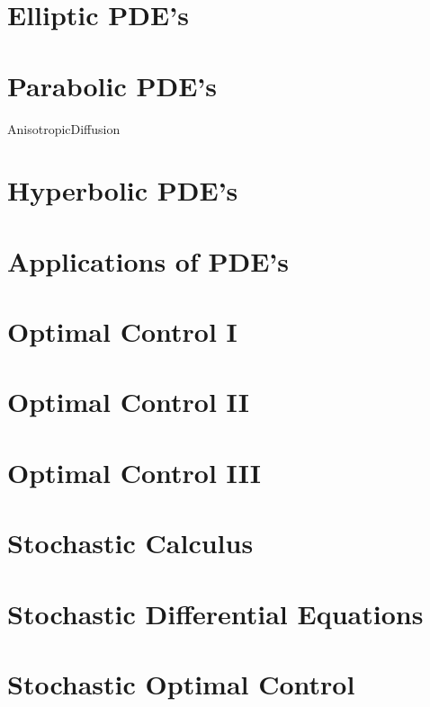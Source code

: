 \documentclass[nociteref]{newsiambook}
\begin{document}
\part{Elliptic PDE's}

\part{Parabolic PDE's}
{AnisotropicDiffusion}

\part{Hyperbolic PDE's}

\part{Applications of PDE's}

\part{Optimal Control I}

\part{Optimal Control II}

\part{Optimal Control III}

\part{Stochastic Calculus}

\part{Stochastic Differential Equations}

\part{Stochastic Optimal Control}
\end{document}
